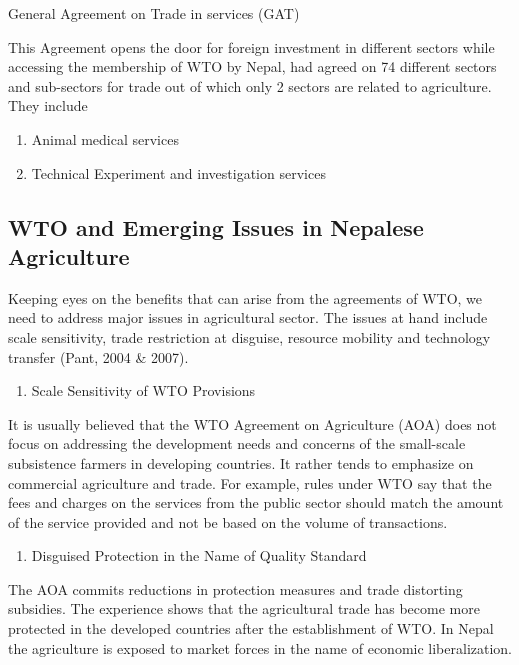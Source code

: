 \documentclass[
  openany]{book}
\providecommand{\tightlist}{%
  \setlength{\itemsep}{0pt}\setlength{\parskip}{0pt}}
\begin{document}
General Agreement on Trade in services (GAT)

This Agreement opens the door for foreign investment in different sectors while accessing the membership of WTO by Nepal, had agreed on 74 different sectors and sub-sectors for trade out of which only 2 sectors are related to agriculture. They include

\begin{enumerate}
\def\labelenumi{\arabic{enumi}.}
\tightlist
\item
  Animal medical services
\item
  Technical Experiment and investigation services
\end{enumerate}

\hypertarget{wto-and-emerging-issues-in-nepalese-agriculture}{%
\subsection{WTO and Emerging Issues in Nepalese Agriculture}\label{wto-and-emerging-issues-in-nepalese-agriculture}}

Keeping eyes on the benefits that can arise from the agreements of WTO, we need to address major issues in agricultural sector. The issues at hand include scale sensitivity, trade restriction at disguise, resource mobility and technology transfer (Pant, 2004 \& 2007).

\begin{enumerate}
\def\labelenumi{\arabic{enumi}.}
\tightlist
\item
  Scale Sensitivity of WTO Provisions
\end{enumerate}

It is usually believed that the WTO Agreement on Agriculture (AOA) does not focus on addressing the development needs and concerns of the small-scale subsistence farmers in developing countries. It rather tends to emphasize on commercial agriculture and trade. For example, rules under WTO say that the fees and charges on the services from the public sector should match the amount of the service provided and not be based on the volume of transactions.

\begin{enumerate}
\def\labelenumi{\arabic{enumi}.}
\setcounter{enumi}{1}
\tightlist
\item
  Disguised Protection in the Name of Quality Standard
\end{enumerate}

The AOA commits reductions in protection measures and trade distorting subsidies. The experience shows that the agricultural trade has become more protected in the developed countries after the establishment of WTO. In Nepal the agriculture is exposed to market forces in the name of economic liberalization.
\end{document}
